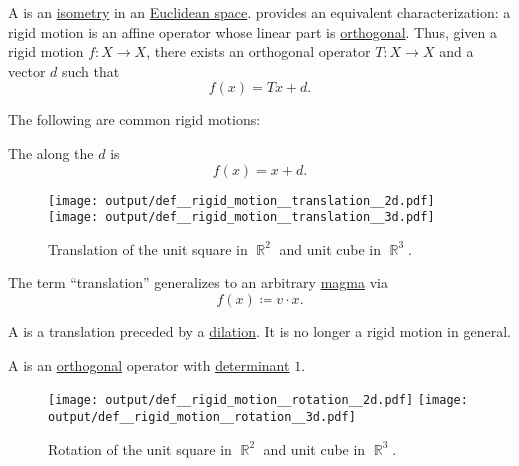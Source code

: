 \begin{definition}\label{def:rigid_motion}\mimprovised
  A  is an \hyperref[def:isometry]{isometry} in an \hyperref[def:euclidean_space]{Euclidean space}.  provides an equivalent characterization: a rigid motion is an affine operator whose linear part is \hyperref[def:unitary_operator]{orthogonal}. Thus, given a rigid motion \( f: X \to X \), there exists an orthogonal operator \( T: X \to X \) and a vector \( d \) such that
  \begin{equation*}
    f(x) = Tx + d.
  \end{equation*}

  The following are common rigid motions:
  \begin{thmenum}
     The  along the  \( d \) is
    \begin{equation*}
      f(x) = x + d.
    \end{equation*}

    \begin{figure}[!ht]
      \hfill
      \texttt{[image: output/def\_\_rigid\_motion\_\_translation\_\_2d.pdf]}
      \hfill
      \texttt{[image: output/def\_\_rigid\_motion\_\_translation\_\_3d.pdf]}
      \hfill
      \hfill
      \caption{Translation of the unit square in \( \BbbR^2 \) and unit cube in \( \BbbR^3 \).}\label{fig:def/rigid_motion/translation}
    \end{figure}

    The term \enquote{translation} generalizes to an arbitrary \hyperref[def:magma]{magma} via
    \begin{equation*}
      f(x) \coloneqq v \cdot x.
    \end{equation*}

    A  is a translation preceded by a \hyperref[def:point]{dilation}. It is no longer a rigid motion in general.

     A  is an \hyperref[def:orthogonal_operator]{orthogonal} operator with \hyperref[def:matrix_determinant]{determinant} \( 1 \).

    \begin{figure}[!ht]
      \hfill
      \texttt{[image: output/def\_\_rigid\_motion\_\_rotation\_\_2d.pdf]}
      \hfill
      \texttt{[image: output/def\_\_rigid\_motion\_\_rotation\_\_3d.pdf]}
      \hfill
      \hfill
      \caption{Rotation of the unit square in \( \BbbR^2 \) and unit cube in \( \BbbR^3 \).}\label{fig:def/rigid_motion/rotation}
    \end{figure}


\end{thmenum}
\end{definition}
